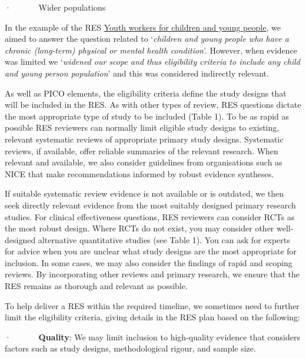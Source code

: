 \documentclass[
  letterpaper,
  DIV=11,
  numbers=noendperiod]{scrreprt}
\begin{document}
·~~~~~~ Wider populations

In the example of the RES
\href{https://arc-gm.nihr.ac.uk/media/Resources/ARC/Evaluation/RES/Youth\%20workers\%20for\%20children\%20and\%20young\%20people/UoM\%20Healthier\%20Futures\%20Rapid\%20Evidence\%20Synthesis\%20-\%20Youth\%20workers\%20for\%20children\%20and\%20young\%20people\%20-\%20January\%202025.pdf}{Youth
workers for children and young people}, we aimed to answer the question
related to `\emph{children and young people who have a chronic
(long-term) physical or mental health condition}'. However, when
evidence was limited we `\emph{widened our scope and thus eligibility
criteria to include any child and young person population}' and this was
considered indirectly relevant.

As well as PICO elements, the eligibility criteria define the study
designs that will be included in the RES. As with other types of review,
RES questions dictate the most appropriate type of study to be included
(Table 1). To be as rapid as possible RES reviewers can normally limit
eligible study designs to existing, relevant systematic reviews of
appropriate primary study designs. Systematic reviews, if available,
offer reliable summaries of the relevant research. When relevant and
available, we also consider guidelines from organisations such as NICE
that make recommendations informed by robust evidence syntheses.

If suitable systematic review evidence is not available or is outdated,
we then seek directly relevant evidence from the most suitably designed
primary research studies. For clinical effectiveness questions, RES
reviewers can consider RCTs as the most robust design. Where RCTs do not
exist, you may consider other well-designed alternative quantitative
studies (see Table 1). You can ask for experts for advice when you are
unclear what study designs are the most appropriate for inclusion. In
some cases, we may also consider the findings of rapid and scoping
reviews. By incorporating other reviews and primary research, we ensure
that the RES remains as thorough and relevant as possible. ~

To help deliver a RES within the required timeline, we sometimes need to
further limit the eligibility criteria, giving details in the RES plan
based on the following:

·~~~~~~ \textbf{Quality}: We may limit inclusion to high-quality
evidence that considers factors such as study designs, methodological
rigour, and sample size.
\end{document}
